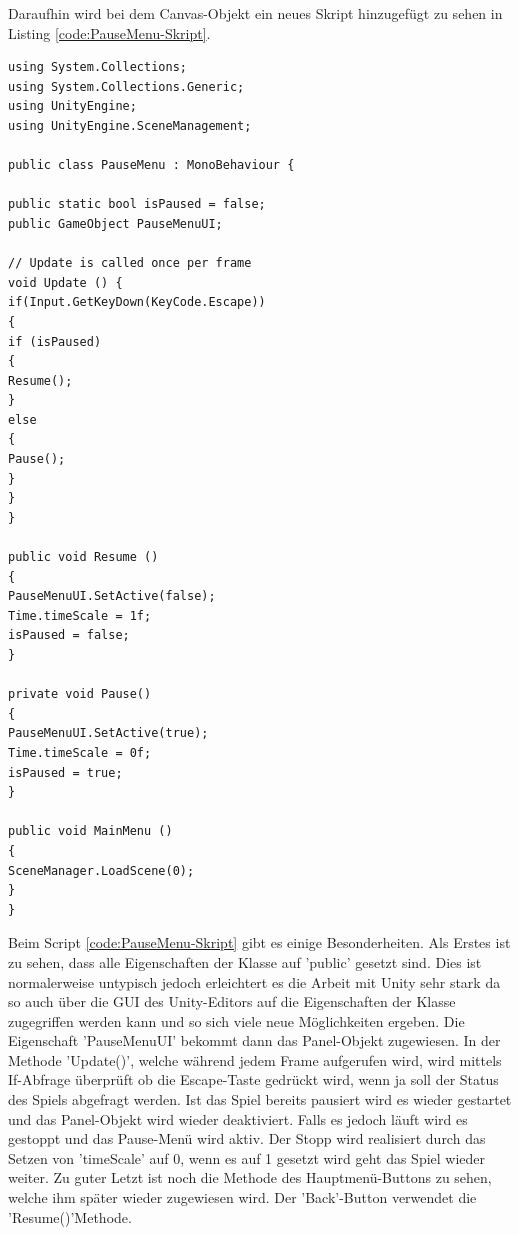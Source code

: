 Daraufhin wird bei dem Canvas-Objekt ein neues Skript hinzugefügt zu sehen in Listing \cref{code:PauseMenu-Skript}.
\begin{lstlisting}[language={[Sharp]C}, caption=PauseMenu-Skript, label=code:PauseMenu-Skript]
using System.Collections;
using System.Collections.Generic;
using UnityEngine;
using UnityEngine.SceneManagement;

public class PauseMenu : MonoBehaviour {

public static bool isPaused = false;
public GameObject PauseMenuUI;

// Update is called once per frame
void Update () {
if(Input.GetKeyDown(KeyCode.Escape))
{
if (isPaused)
{
Resume();
}
else
{
Pause();
}
}
}

public void Resume ()
{
PauseMenuUI.SetActive(false);
Time.timeScale = 1f;
isPaused = false;
}

private void Pause()
{
PauseMenuUI.SetActive(true);
Time.timeScale = 0f;
isPaused = true;
}

public void MainMenu ()
{
SceneManager.LoadScene(0);
}
}
\end{lstlisting}
Beim Script \cref{code:PauseMenu-Skript} gibt es einige Besonderheiten. Als Erstes ist zu sehen, dass alle Eigenschaften der Klasse auf ’public’ gesetzt sind. Dies ist normalerweise untypisch jedoch erleichtert es die Arbeit mit Unity sehr stark da so auch über die GUI des Unity-Editors auf die Eigenschaften der Klasse zugegriffen werden kann und so sich viele neue Möglichkeiten ergeben. Die Eigenschaft ’PauseMenuUI’ bekommt dann das Panel-Objekt zugewiesen.
In der Methode ’Update()’, welche während jedem Frame aufgerufen wird, wird mittels If-Abfrage überprüft ob die Escape-Taste gedrückt wird, wenn ja soll der Status des Spiels abgefragt werden. Ist das Spiel bereits pausiert wird es wieder gestartet und das Panel-Objekt wird wieder deaktiviert. Falls es jedoch läuft wird es gestoppt und das Pause-Menü wird aktiv. Der Stopp wird realisiert durch das Setzen von ’timeScale’ auf 0, wenn es auf 1 gesetzt wird geht das Spiel wieder weiter.
Zu guter Letzt ist noch die Methode des Hauptmenü-Buttons zu sehen, welche ihm später wieder zugewiesen wird. Der ’Back’-Button verwendet die ’Resume()’Methode.


